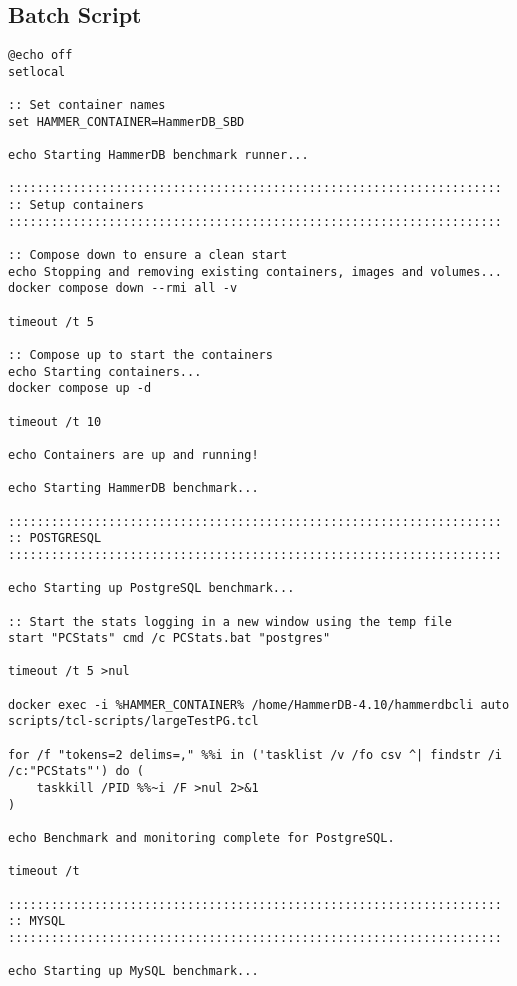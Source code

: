 \subsection{Batch Script}
\label{sec:batch-script}

\begin{lstlisting}[caption={Batch script to run the TCL scripts}, label={lst:batch-script}]
@echo off
setlocal

:: Set container names
set HAMMER_CONTAINER=HammerDB_SBD

echo Starting HammerDB benchmark runner...

:::::::::::::::::::::::::::::::::::::::::::::::::::::::::::::::::::::
:: Setup containers
:::::::::::::::::::::::::::::::::::::::::::::::::::::::::::::::::::::

:: Compose down to ensure a clean start
echo Stopping and removing existing containers, images and volumes...
docker compose down --rmi all -v

timeout /t 5

:: Compose up to start the containers
echo Starting containers...
docker compose up -d

timeout /t 10

echo Containers are up and running!

echo Starting HammerDB benchmark...

:::::::::::::::::::::::::::::::::::::::::::::::::::::::::::::::::::::
:: POSTGRESQL
:::::::::::::::::::::::::::::::::::::::::::::::::::::::::::::::::::::

echo Starting up PostgreSQL benchmark...

:: Start the stats logging in a new window using the temp file
start "PCStats" cmd /c PCStats.bat "postgres"

timeout /t 5 >nul

docker exec -i %HAMMER_CONTAINER% /home/HammerDB-4.10/hammerdbcli auto scripts/tcl-scripts/largeTestPG.tcl

for /f "tokens=2 delims=," %%i in ('tasklist /v /fo csv ^| findstr /i /c:"PCStats"') do (
    taskkill /PID %%~i /F >nul 2>&1
)

echo Benchmark and monitoring complete for PostgreSQL.

timeout /t 

:::::::::::::::::::::::::::::::::::::::::::::::::::::::::::::::::::::
:: MYSQL
:::::::::::::::::::::::::::::::::::::::::::::::::::::::::::::::::::::

echo Starting up MySQL benchmark...


\end{lstlisting}
